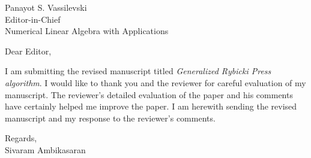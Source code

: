 \documentclass[a4paper,10pt]{letter}
\date{\today}
\begin{document}
\begin{letter}{Panayot S. Vassilevski\\
Editor-in-Chief\\
Numerical Linear Algebra with Applications}

\opening{Dear Editor,} %

\onehalfspacing

I am submitting the revised manuscript titled {\em Generalized Rybicki Press algorithm}. I would like to thank you and the reviewer for careful evaluation of my manuscript. The reviewer's detailed evaluation of the paper and his comments have certainly helped me improve the paper. I am herewith sending the revised manuscript and my response to the reviewer's comments.

\closing{Regards,\\
Sivaram Ambikasaran}


\end{letter}
\end{document}
